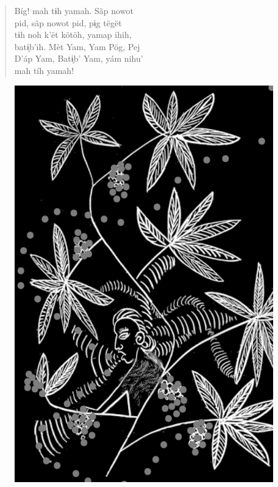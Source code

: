 \begin{verse}
Bíg! mah tɨh yamah. Sãp nowot\\
pid, sãp nowot pid, pɨ̗g tëgët\\
tɨh noh k’ët kötöh, yamap ihih,\\
batɨ̗b’ih. Mèt Yam, Yam Pög, Pej\\
D’áp Yam, Batɨ̗b’ Yam, yám nihu’\\
mah tíh yamah!
\end{verse}

\vspace*{\fill}

\begin{figure}
\vspace*{-1.2cm}
\hspace*{-2.2cm}\includegraphics[width=138mm]{./imgs/img3.jpg}
\end{figure}

